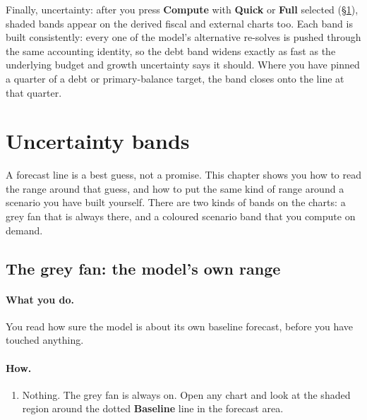 \documentclass[11pt]{article}
\theoremstyle{definition}
\theoremstyle{remark}
\begin{document}
Finally, uncertainty: after you press \textbf{Compute} with \textbf{Quick} or \textbf{Full}
selected (\S\ref{sec:use-uncertainty}), shaded bands appear on the derived fiscal and external
charts too. Each band is built consistently: every one of the model's alternative re-solves is
pushed through the same accounting identity, so the debt band widens exactly as fast as the
underlying budget and growth uncertainty says it should. Where you have pinned a quarter of a
debt or primary-balance target, the band closes onto the line at that quarter.

\section{Uncertainty bands}\label{sec:use-uncertainty}

A forecast line is a best guess, not a promise. This chapter shows you how to read the
range around that guess, and how to put the same kind of range around a scenario you
have built yourself. There are two kinds of bands on the charts: a grey fan that is
always there, and a coloured scenario band that you compute on demand.

\subsection{The grey fan: the model's own range}

\paragraph{What you do.} You read how sure the model is about its own baseline forecast,
before you have touched anything.

\paragraph{How.}
\begin{enumerate}
  \item Nothing. The grey fan is always on. Open any chart and look at the shaded
    region around the dotted \textbf{Baseline} line in the forecast area.
\end{enumerate}
\end{document}
